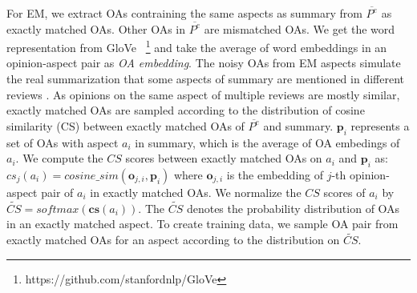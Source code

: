 For EM,
we extract OAs contraining the same aspects as summary from $\overline{P^e}$ as exactly matched OAs.
Other OAs in $\overline{P^e}$ are mismatched OAs.
{%
We get the word representation from GloVe
~\footnote{https://github.com/stanfordnlp/GloVe}
and take the average of word embeddings in an opinion-aspect pair
as {\em OA embedding}.
The noisy OAs from EM aspects simulate the real summarization that
some aspects of summary are mentioned in different reviews .
As opinions on the same aspect of multiple reviews are mostly similar,
exactly matched OAs are sampled according to
the distribution of cosine similarity (CS) 
between exactly matched OAs of $\overline{P^e}$ and summary.
$\boldsymbol{p}_i$ represents a set of OAs with aspect $a_i$ in summary,
which is the average of OA embedings of $a_i$.
 We compute the $CS$ scores between exactly matched OAs on $a_i$ and $\boldsymbol{p}_i$ as: $cs_j(a_i)=cosine\_sim(\boldsymbol{o}_{j,i}, \boldsymbol{p}_{i})$
where $\boldsymbol{o}_{j,i}$ is the embedding of $j$-th opinion-aspect pair of $a_i$ in exactly matched OAs.
We normalize the $CS$ scores of $a_i$
by $\widetilde{CS}=softmax(\mathbf{cs}(a_i))$. 
The $\widetilde{CS}$ denotes the probability distribution 
of OAs in an exactly matched aspect.
To create training data,
we sample OA pair from exactly matched OAs for an aspect
according to the distribution on $\widetilde{CS}$. %
}
